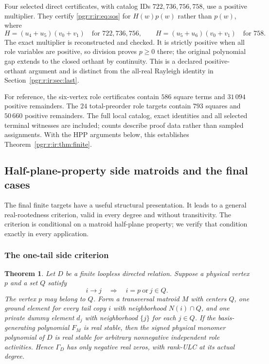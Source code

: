 \documentclass[11pt]{article}
\numberwithin{equation}{section}
\newtheorem{theorem}{Theorem}[section]\newtheorem{lemma}[theorem]{Lemma}\newtheorem{proposition}[theorem]{Proposition}\newtheorem{corollary}[theorem]{Corollary}
\theoremstyle{definition}\newtheorem{definition}[theorem]{Definition}\newtheorem{remark}[theorem]{Remark}
\newcommand{\Ga}{\Gamma}                   %
\begin{document}
Four selected direct certificates, with catalog IDs $722,736,756,758$, use a positive multiplier. They certify \eqref{pgr:r:ir:eq:sos} for $H(w)p(w)$ rather than $p(w)$, where
\[
 H=(u_4+u_5)(v_0+v_1)\quad\text{for }722,736,756,
 \qquad H=(u_5+u_6)(v_0+v_1)\quad\text{for }758.
\]
The exact multiplier is reconstructed and checked. It is strictly positive when all role variables are positive, so division proves $p\ge0$ there; the original polynomial gap extends to the closed orthant by continuity. This is a declared positive-orthant argument and is distinct from the all-real Rayleigh identity in Section~\ref{pgr:r:ir:sec:last}.

For reference, the six-vertex role certificates contain $586$ square terms and $31\,094$ positive remainders. The $24$ total-preorder role targets contain $793$ squares and $50\,660$ positive remainders. The full local catalog, exact identities and all selected terminal witnesses are included; counts describe proof data rather than sampled assignments. With the HPP arguments below, this establishes Theorem~\ref{pgr:r:ir:thm:finite}.

\subsection{Half-plane-property side matroids and the final cases}\label{pgr:r:ir:sec:oneside}
The final finite targets have a useful structural presentation. It leads to a general real-rootedness criterion, valid in every degree and without transitivity. The criterion is conditional on a matroid half-plane property; we verify that condition exactly in every application.

\subsubsection{The one-tail side criterion}
\begin{theorem}\label{pgr:r:ir:thm:oneside}
Let $D$ be a finite loopless directed relation. Suppose a physical vertex $p$ and a set $Q$ satisfy
\[
 i\to j\quad\Longrightarrow\quad i=p\ \text{or}\ j\in Q.
\]
The vertex $p$ may belong to $Q$. Form a transversal matroid $M$ with centers $Q$, one ground element for every tail copy $i$ with neighborhood $N(i)\cap Q$, and one private dummy element $d_j$ with neighborhood $\{j\}$ for each $j\in Q$. If the basis-generating polynomial $F_M$ is real stable, then the signed physical monomer polynomial of $D$ is real stable for arbitrary nonnegative independent role activities. Hence $\Ga_D$ has only negative real zeros, with rank-ULC at its actual degree.
\end{theorem}
\end{document}
